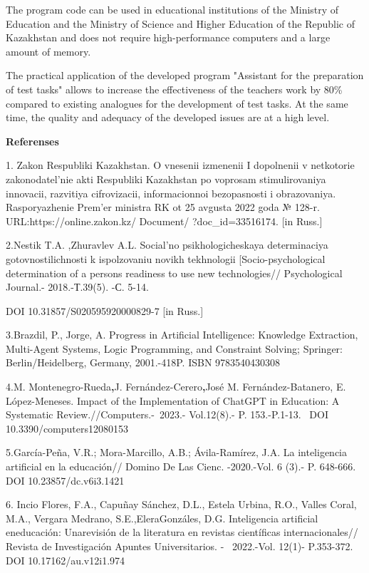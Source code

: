 The program code can be used in educational institutions of the Ministry
of Education and the Ministry of Science and Higher Education of the
Republic of Kazakhstan and does not require high-performance computers
and a large amount of memory.

The practical application of the developed program "Assistant for the
preparation of test tasks" allows to increase the effectiveness of the
teacher\textquotesingle s work by 80\% compared to existing analogues
for the development of test tasks. At the same time, the quality and
adequacy of the developed issues are at a high level.

{\bfseries Referenses}

1. Zakon Respubliki Kazakhstan. O vnesenii izmenenii I dopolnenii v
netkotorie zakonodatel'nie akti Respubliki Kazakhstan po voprosam
stimulirovaniya innovacii, razvitiya cifrovizacii, informacionnoi
bezopasnosti i obrazovaniya. Rasporyazhenie Prem'er ministra RK ot 25
avgusta 2022 goda № 128-r. URL:https://online.zakon.kz/ Document/
?doc\_id=33516174. {[}in Russ.{]}

2.Nestik T.A. ,Zhuravlev A.L. Social'no psikhologicheskaya determinaciya
gotovnostilichnosti k ispolzovaniu novikh tekhnologii
{[}Socio-psychological determination of a person\textquotesingle s
readiness to use new technologies// Psychological Journal.-
2018.-Т.39(5). -С. 5-14.

DOI 10.31857/S020595920000829-7 {[}in Russ.{]}

3.Brazdil, P., Jorge, A. Progress in Artificial Intelligence: Knowledge
Extraction, Multi-Agent Systems, Logic Programming, and Constraint
Solving; Springer: Berlin/Heidelberg, Germany, 2001.-418P. ISBN
9783540430308

4.M. Montenegro-Rueda{\bfseries ,}J. Fernández-Cerero{\bfseries ,}José M.
Fernández-Batanero, E. López-Meneses. Impact of the Implementation of
ChatGPT in Education: A Systematic Review.//Computers.-\emph{~}2023.-
Vol.12(8).- P. 153.-P.1-13. ~DOI 10.3390/computers12080153

5.García-Peña, V.R.; Mora-Marcillo, A.B.; Ávila-Ramírez, J.A. La
inteligencia artificial en la educación// Domino De Las Cienc.
-2020.-Vol. 6 (3).- P. 648-666. DOI 10.23857/dc.v6i3.1421

6. Incio Flores, F.A., Capuñay Sánchez, D.L., Estela Urbina, R.O.,
Valles Coral, M.A., Vergara Medrano, S.E.,EleraGonzáles, D.G.
Inteligencia artificial eneducación: Unarevisión de la literatura en
revistas científicas internacionales// Revista de Investigación Apuntes
Universitarios. - ~2022.-Vol. 12(1)- P.353-372. DOI
10.17162/au.v12i1.974

